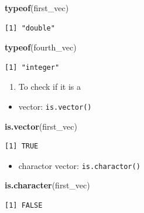 \documentclass[
]{book}
\newenvironment{Shaded}{\begin{snugshade}}{\end{snugshade}}
\newcommand{\KeywordTok}[1]{\textcolor[rgb]{0.13,0.29,0.53}{\textbf{#1}}}
\newcommand{\NormalTok}[1]{#1}
\providecommand{\tightlist}{%
  \setlength{\itemsep}{0pt}\setlength{\parskip}{0pt}}
\begin{document}
\begin{Shaded}
\begin{Highlighting}[]
\KeywordTok{typeof}\NormalTok{(first_vec)}
\end{Highlighting}
\end{Shaded}

\begin{verbatim}
[1] "double"
\end{verbatim}

\begin{Shaded}
\begin{Highlighting}[]
\KeywordTok{typeof}\NormalTok{(fourth_vec)}
\end{Highlighting}
\end{Shaded}

\begin{verbatim}
[1] "integer"
\end{verbatim}

\begin{enumerate}
\def\labelenumi{\arabic{enumi}.}
\setcounter{enumi}{1}
\tightlist
\item
  To check if it is a
\end{enumerate}

\begin{itemize}
\tightlist
\item
  vector: \texttt{is.vector()}
\end{itemize}

\begin{Shaded}
\begin{Highlighting}[]
\KeywordTok{is.vector}\NormalTok{(first_vec)}
\end{Highlighting}
\end{Shaded}

\begin{verbatim}
[1] TRUE
\end{verbatim}

\begin{itemize}
\tightlist
\item
  charactor vector: \texttt{is.charactor()}
\end{itemize}

\begin{Shaded}
\begin{Highlighting}[]
\KeywordTok{is.character}\NormalTok{(first_vec)}
\end{Highlighting}
\end{Shaded}

\begin{verbatim}
[1] FALSE
\end{verbatim}
\end{document}
